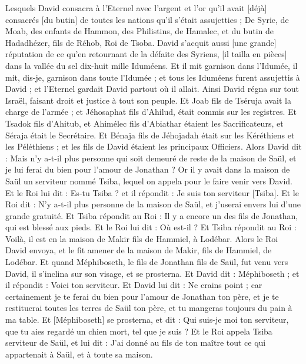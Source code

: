 \begin{multicols}{2}
Lesquels David consacra à l'Eternel avec l'argent et l'or qu'il avait [déjà] consacrés [du butin] de toutes les nations qu'il s'était assujetties ;
De Syrie, de Moab, des enfants de Hammon, des Philistins, de Hamalec, et du butin de Hadadhézer, fils de Réhob, Roi de Tsoba.
David s'acquit aussi [une grande] réputation de ce qu'en retournant de la défaite des Syriens, [il tailla en pièces] dans la vallée du sel dix-huit mille Iduméens.
Et il mit garnison dans l'Idumée, il mit, dis-je, garnison dans toute l'Idumée ; et tous les Iduméens furent assujettis à David ; et l'Eternel gardait David partout où il allait.
Ainsi David régna sur tout Israël, faisant droit et justice à tout son peuple.
Et Joab fils de Tséruja avait la charge de l'armée ; et Jéhosaphat fils d'Ahilud, était commis sur les registres.
Et Tsadok fils d'Ahitub, et Ahimélec fils d'Abiathar étaient les Sacrificateurs, et Séraja était le Secrétaire.
Et Bénaja fils de Jéhojadah était sur les Kéréthiens et les Péléthiens ; et les fils de David étaient les principaux Officiers.
\VerseOne{}Alors David dit : Mais n'y a-t-il plus personne qui soit demeuré de reste de la maison de Saül, et je lui ferai du bien pour l'amour de Jonathan ?
Or il y avait dans la maison de Saül un serviteur nommé Tsiba, lequel on appela pour le faire venir vers David. Et le Roi lui dit : Es-tu Tsiba ? et il répondit : Je suis ton serviteur [Tsiba].
Et le Roi dit : N'y a-t-il plus personne de la maison de Saül, et j'userai envers lui d'une grande gratuité. Et Tsiba répondit au Roi : Il y a encore un des fils de Jonathan, qui est blessé aux pieds.
Et le Roi lui dit : Où est-il ? Et Tsiba répondit au Roi : Voilà, il est en la maison de Makir fils de Hammiel, à Lodébar.
Alors le Roi David envoya, et le fit amener de la maison de Makir, fils de Hammiel, de Lodébar.
Et quand Méphiboseth, le fils de Jonathan fils de Saül, fut venu vers David, il s'inclina sur son visage, et se prosterna. Et David dit : Méphiboseth ; et il répondit : Voici ton serviteur.
Et David lui dit : Ne crains point ; car certainement je te ferai du bien pour l'amour de Jonathan ton père, et je te restituerai toutes les terres de Saül ton père, et tu mangeras toujours du pain à ma table.
Et [Méphiboseth] se prosterna, et dit : Qui suis-je moi ton serviteur, que tu aies regardé un chien mort, tel que je suis ?
Et le Roi appela Tsiba serviteur de Saül, et lui dit : J'ai donné au fils de ton maître tout ce qui appartenait à Saül, et à toute sa maison.

\end{multicols}
